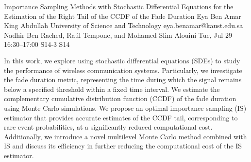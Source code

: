 \begin{talk}
  {Importance Sampling Methods with Stochastic Differential Equations for the Estimation of the Right Tail of the CCDF of the Fade Duration}%
  {Eya Ben Amar}%
  {King Abdullah University of Science and Technology}%
  {eya.benamar@kaust.edu.sa}%
  {Nadhir Ben Rached, Ra\'ul Tempone, and Mohamed-Slim Alouini}%
  {}%
  {Tue, Jul 29 16:30–17:00}%
  {S14-3}%
  {S14}%
  
				
In this work, we explore using stochastic differential equations (SDEs) to study the performance of wireless communication systems. Particularly, we investigate the fade duration metric, representing the time during which the signal remains below a specified threshold within a fixed time interval. We estimate the complementary cumulative distribution function (CCDF) of the fade duration using Monte Carlo simulations. We propose an optimal importance sampling (IS) estimator that provides accurate estimates of the CCDF tail, corresponding to rare event probabilities, at a significantly reduced computational cost. Additionally, we introduce a novel multilevel Monte Carlo method combined with IS and discuss its efficiency in further reducing the computational cost of the IS estimator.
\medskip

\end{talk}

